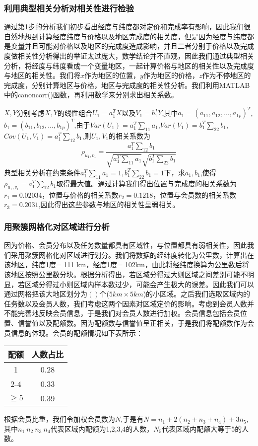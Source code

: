 \documentclass{ctexart}
\begin{document}
\subsubsection{利用典型相关分析对相关性进行检验}
通过第1步的分析我们初步看出经度与纬度都对定价和完成率有影响，因此我们很自然地想到计算经度纬度与价格以及地区完成度的相关度，但是因为经度与纬度都是变量并且可能对价格以及地区的完成度造成影响，并且二者分别于价格以及完成度做相关性分析得出的举证太过庞大，数学结论并不直观，因此我们通过典型相关分析，将经度与纬度看成一个变量地区，一起计算价格与地区的相关性以及完成度与地区的相关性。我们将$x$作为地区的位置，$y$作为地区的价格，$z$作为不停地区的完成度，分别计算地区与价格，地区与完成度的相关性分析。我们利用MATLAB中的canoncorr()函数，再利用数学来分别求出相关系数。

$X,Y$分别考虑$X,Y$的线性组合$U_1=a^{T}_{1}X$以及$V_1=b^{T}_{1}Y$,其中$a_1=(a_{11},a_{12},\dots,a_{1p})^T$,$b_1=(b_{11},b_{12},\dots,b_{1p})^T$,由于$Var(U_1)=a_{1}^{T}\sum_{11} a_1$,$Var(V_1)=b_{1}^{T}\sum_{22} b_1$,$Cov(U_1,V_1)=a_{1}^{T}\sum_{12} b_1$,则$U_1,V_1$的相关系数为$$\rho_{u_1,v_1}=\frac{a_{1}^{T}\sum_{12} b_1}{\sqrt{a_{1}^{T}\sum_{11} a_1} \sqrt{b_{1}^{T}\sum_{22} b_1}}$$
典型相关分析在约束条件$a_{1}^{T}\sum_{11} a_1=1,b_{1}^{T}\sum_{22} b_1=1$下，求$a_1,b_1$,使得
$\rho_{u_1,v_1}={a_{1}^{T}\sum_{12} b_1}$取得最大值。通过计算我们得出位置与完成度的相关系数为$r_1=0.02034$，位置与价格的相关系数$r_2=0.1218$，位置与会员数的相关系数$r_3=0.2031$,因此得出这些参数与地区的相关性呈弱相关。
\subsubsection{用聚簇网格化对区域进行分析}
因为价格、会员分布以及任务数量都具有区域性，与位置都具有弱相关性，因此我们采用聚簇网格化对区域进行划分。我们将数据的经纬度转化为公里数，计算出在该地区，纬度1度= 111 km，经度1度= 102km，由此将经纬度换算为公里数后将该地区按照公里数分块。根据分析得出，若区域分得过大则区域之间差别可能不明显，若区域分得过小则区域内样本数过少，可能会产生极大的误差。因此我们可以通过网格把该大地区划分为$()$个($5km\times5km$)的小区域。之后我们选取区域内的任务数以及会员人数，我们考虑这两个因素对区域定价的影响。考虑到会员人数并不能完善地反映会员信息，于是我们对会员人数进行加权。会员信息包括会员位置、信誉值以及配额数。因为配额数与信誉值呈正相关，于是我们将配额数作为会员信息的体现。会员的配额情况如下表所示：
\begin{table}[htbp]
\centering
\begin{tabular}{|c|c|}
\hline
配额&人数占比\\
\hline
1 &0.28\\
\hline
2-4&0.33\\
\hline
$\ge5$&0.39\\
\hline
\end{tabular}
\end{table}
\newpage
根据会员比重，我们令加权会员数为$N$,于是有$N=n_1+2(n_2+n_3+n_4)+3n_5$,其中$n_1\ n_2\ n_3\ n_4$代表区域内配额为1,2,3,4的人数，$N_5$代表区域内配额大等于5的人数。
\end{document}
